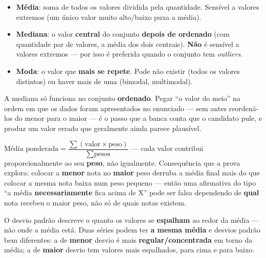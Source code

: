 \begin{conceito}
\begin{itemize}
\item \textbf{Média}: soma de todos os valores dividida pela quantidade.
Sensível a valores extremos (um único valor muito alto/baixo puxa a média).
\item \textbf{Mediana}: o valor \textbf{central} do conjunto \textbf{depois
de ordenado} (com quantidade par de valores, a média dos dois centrais).
\textbf{Não} é sensível a valores extremos --- por isso é preferida quando
o conjunto tem \textit{outliers}.
\item \textbf{Moda}: o valor que \textbf{mais se repete}. Pode não existir
(todos os valores distintos) ou haver mais de uma (bimodal, multimodal).
\end{itemize}
\end{conceito}

\begin{cuidado}
A mediana só funciona no conjunto \textbf{ordenado}. Pegar “o valor do
meio” na ordem em que os dados foram apresentados no enunciado --- sem
antes reordená-los do menor para o maior --- é o passo que a banca conta
que o candidato pule, e produz um valor errado que geralmente ainda parece
plausível.
\end{cuidado}

\begin{conceito}
$\text{Média ponderada} = \dfrac{\sum(\text{valor} \times \text{peso})}
{\sum \text{pesos}}$ --- cada valor contribui proporcionalmente ao seu
\textbf{peso}, não igualmente. Consequência que a prova explora: colocar a
\textbf{menor} nota no \textbf{maior} peso derruba a média final mais do
que colocar a mesma nota baixa num peso pequeno --- então uma afirmativa
do tipo “a média \textbf{necessariamente} fica acima de X” pode ser falsa
dependendo de \textbf{qual} nota recebeu o maior peso, não só de quais
notas existem.
\end{conceito}

\begin{conceito}
O desvio padrão descreve o quanto os valores se \textbf{espalham} ao redor
da média --- não onde a média está. Duas séries podem ter \textbf{a mesma
média} e desvios padrão bem diferentes: a de \textbf{menor} desvio é mais
\textbf{regular/concentrada} em torno da média; a de \textbf{maior} desvio
tem valores mais espalhados, para cima e para baixo.
\end{conceito}


